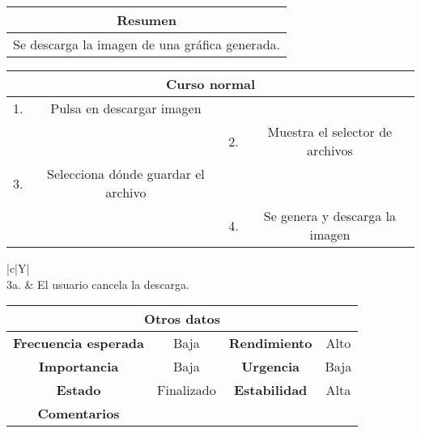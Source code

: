 \begin{table}[!h]
\begin{tabular}{|c|}
\hline
\cellcolor{cyan} \textbf{Resumen}  \\
\hline
Se descarga la imagen de una gráfica generada. \\
\hline
\end{tabular}
\end{table}

\begin{table}[!h]
\begin{tabular}{|c|c|c|c|}
\hline
\multicolumn{4}{|c|}{\cellcolor{cyan} \textbf{Curso normal}} \\
\hline
     1.         &     Pulsa en descargar imagen           &              &              \\
\hline
              &               &    2.          &     Muestra el selector de archivos         \\
\hline
     3.         &     Selecciona dónde guardar el archivo          &              &             \\
\hline
               &                                            &    4.   & Se genera y descarga la imagen \\
\hline
\end{tabular}
\end{table}

\begin{table}[!h]
\begin{tabularx}{\textwidth}{|c|Y|}
\hline
{} \\
\hline
     3a.         &    El usuario cancela la descarga.    \\
\hline
\end{tabularx}
\end{table}

\begin{table}[!h]
\begin{tabular}{|c|c|c|c|}
\hline
\multicolumn{4}{|c|}{\cellcolor{cyan} \textbf{Otros datos}} \\
\hline
 \cellcolor{cyan} \textbf{Frecuencia esperada}             &      Baja         &    \cellcolor{cyan} \textbf{Rendimiento}          &      Alto        \\
\hline
 \cellcolor{cyan} \textbf{Importancia}             &      Baja         &     \cellcolor{cyan} \textbf{Urgencia}         &      Baja        \\
\hline
 \cellcolor{cyan} \textbf{Estado}             &       Finalizado        &    \cellcolor{cyan} \textbf{Estabilidad}          &     Alta         \\
\hline
\cellcolor{cyan} \textbf{Comentarios}        &  \multicolumn{3}{|c|}{} \\
\hline
\end{tabular}
\end{table}











